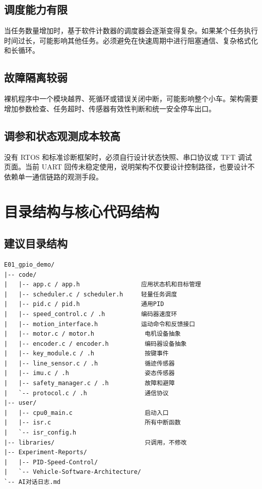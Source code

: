 \documentclass[11pt,a4paper,fontset=fandol]{ctexart}
\begin{document}
\subsection{调度能力有限}

当任务数量增加时，基于软件计数器的调度器会逐渐变得复杂。如果某个任务执行时间过长，可能影响其他任务。必须避免在快速周期中进行阻塞通信、复杂格式化和长循环。

\subsection{故障隔离较弱}

裸机程序中一个模块越界、死循环或错误关闭中断，可能影响整个小车。架构需要增加参数检查、任务超时、传感器有效性判断和统一安全停车出口。

\subsection{调参和状态观测成本较高}

没有 RTOS 和标准诊断框架时，必须自行设计状态快照、串口协议或 TFT 调试页面。当前 UART 回传未稳定使用，说明架构不仅要设计控制路径，也要设计不依赖单一通信链路的观测手段。

\section{目录结构与核心代码结构}

\subsection{建议目录结构}

\begin{lstlisting}
E01_gpio_demo/
|-- code/
|   |-- app.c / app.h                 应用状态机和目标管理
|   |-- scheduler.c / scheduler.h     轻量任务调度
|   |-- pid.c / pid.h                 通用PID
|   |-- speed_control.c / .h          编码器速度环
|   |-- motion_interface.h            运动命令和反馈接口
|   |-- motor.c / motor.h              电机设备抽象
|   |-- encoder.c / encoder.h          编码器设备抽象
|   |-- key_module.c / .h              按键事件
|   |-- line_sensor.c / .h             循迹传感器
|   |-- imu.c / .h                     姿态传感器
|   |-- safety_manager.c / .h          故障和避障
|   `-- protocol.c / .h                通信协议
|-- user/
|   |-- cpu0_main.c                    启动入口
|   |-- isr.c                          所有中断函数
|   `-- isr_config.h
|-- libraries/                         只调用，不修改
|-- Experiment-Reports/
|   |-- PID-Speed-Control/
|   `-- Vehicle-Software-Architecture/
`-- AI对话日志.md
\end{lstlisting}
\end{document}
